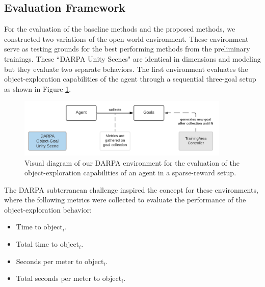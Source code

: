 \subsection{Evaluation Framework}\label{chap:3:further-use:evaluation-framework}
For the evaluation of the baseline methods and the proposed methods, we constructed two variations of the open world environment. These environment serve as testing grounds for the best performing methods from the preliminary trainings. These “DARPA Unity Scenes" are identical in dimensions and modeling but they evaluate two separate behaviors. The first environment evaluates the object-exploration capabilities of the agent through a sequential three-goal setup as shown in Figure \ref{fig:darpa-object-setup}. 
\begin{figure}[!ht]
        \centering
        \includegraphics[width=0.9\textwidth]{images/darpa-object-setup_3.png} 
        \caption{Visual diagram of our DARPA environment for the evaluation of the object-exploration capabilities of an agent in a sparse-reward setup.}
        \label{fig:darpa-object-setup}
\end{figure}

The DARPA subterranean challenge \cite{darpa_subterranean_challenge} inspired the concept for these environments, where the following metrics were collected to evaluate the performance of the object-exploration behavior:
\begin{multicols}{2}
    \begin{itemize}
        \item Time to object$_i$.
        \item Total time to object$_i$.
        \item Seconds per meter to object$_i$.
        \item Total seconds per meter to object$_i$.
    \end{itemize}
\end{multicols}

